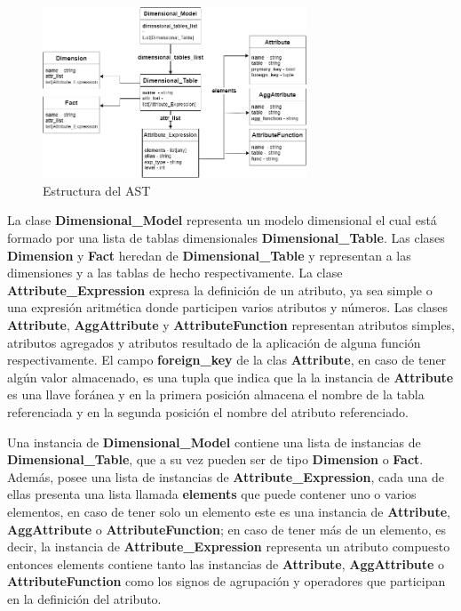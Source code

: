 \begin{figure}[htb]
    \centering
    \includegraphics[width=0.7\textwidth]{Graphics/ast.png}
    \caption{Estructura del AST}
    \label{fig:ast}
\end{figure}

La clase \textbf{Dimensional\_Model} representa un modelo dimensional el cual est\'a formado por una lista de tablas 
dimensionales \textbf{Dimensional\_Table}. Las clases \textbf{Dimension} y \textbf{Fact} heredan de \textbf{Dimensional\_Table} 
y representan a las dimensiones y a las tablas de hecho respectivamente. La clase \textbf{Attribute\_Expression} expresa 
la definici\'on de un atributo, ya sea simple o una expresi\'on aritm\'etica donde participen varios atributos y n\'umeros. 
Las clases \textbf{Attribute}, \textbf{AggAttribute} y \textbf{AttributeFunction} representan atributos simples, atributos 
agregados y atributos resultado de la aplicación de alguna funci\'on respectivamente. El campo \textbf{foreign\_key} de 
la clas \textbf{Attribute}, en caso de tener alg\'un valor almacenado, es una tupla que indica que la la instancia 
de \textbf{Attribute} es una llave for\'anea y en la primera posici\'on almacena el nombre de la tabla referenciada y 
en la segunda posici\'on el nombre del atributo referenciado.

Una instancia de \textbf{Dimensional\_Model} contiene una lista de instancias de \textbf{Dimensional\_Table}, que a su vez pueden ser de tipo 
\textbf{Dimension} o \textbf{Fact}. Adem\'as, posee una lista de instancias de \textbf{Attribute\_Expression}, cada 
una de ellas presenta 
una lista llamada \textbf{elements} que puede contener uno o varios elementos, en caso de tener solo un elemento 
este es una instancia de \textbf{Attribute}, \textbf{AggAttribute} o \textbf{AttributeFunction}; en caso de tener 
m\'as de un elemento, es decir, la instancia de \textbf{Attribute\_Expression} representa un atributo compuesto entonces 
elements contiene tanto las instancias de \textbf{Attribute}, \textbf{AggAttribute} o \textbf{AttributeFunction} como 
los signos de agrupaci\'on y operadores que participan en la definición del atributo.

